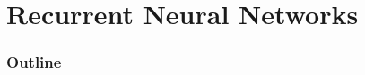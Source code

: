 \renewcommand{\prevpart}{6 }
\renewcommand{\thispart}{7 }
\renewcommand{\nextpart}{8 }
\renewcommand{\thispartname}{Recurrent Neural Networks}

\part{\thispartname}



\section{Outline}

